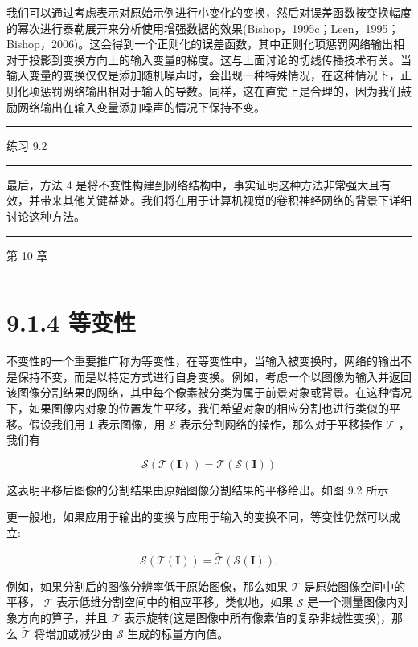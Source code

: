\documentclass[10pt]{report}
\newcommand{\HRule}{\begin{center}\rule{0.9\linewidth}{0.2mm}\end{center}}
\begin{document}
我们可以通过考虑表示对原始示例进行小变化的变换，然后对误差函数按变换幅度的幂次进行泰勒展开来分析使用增强数据的效果(Bishop，1995c；Leen，1995；Bishop，2006)。这会得到一个正则化的误差函数，其中正则化项惩罚网络输出相对于投影到变换方向上的输入变量的梯度。这与上面讨论的切线传播技术有关。当输入变量的变换仅仅是添加随机噪声时，会出现一种特殊情况，在这种情况下，正则化项惩罚网络输出相对于输入的导数。同样，这在直觉上是合理的，因为我们鼓励网络输出在输入变量添加噪声的情况下保持不变。

\HRule

练习 9.2

\HRule

最后，方法 4 是将不变性构建到网络结构中，事实证明这种方法非常强大且有效，并带来其他关键益处。我们将在用于计算机视觉的卷积神经网络的背景下详细讨论这种方法。

\HRule

第 10 章

\HRule

\section*{9.1.4 等变性}

不变性的一个重要推广称为等变性，在等变性中，当输入被变换时，网络的输出不是保持不变，而是以特定方式进行自身变换。例如，考虑一个以图像为输入并返回该图像分割结果的网络，其中每个像素被分类为属于前景对象或背景。在这种情况下，如果图像内对象的位置发生平移，我们希望对象的相应分割也进行类似的平移。假设我们用 \(\mathbf{I}\) 表示图像，用 \(\mathcal{S}\) 表示分割网络的操作，那么对于平移操作 \(\mathcal{T}\) ，我们有

\[
\mathcal{S}\left( {\mathcal{T}\left( \mathbf{I}\right) }\right)  = \mathcal{T}\left( {\mathcal{S}\left( \mathbf{I}\right) }\right)  \tag{9.2}
\]

这表明平移后图像的分割结果由原始图像分割结果的平移给出。如图 9.2 所示

更一般地，如果应用于输出的变换与应用于输入的变换不同，等变性仍然可以成立:

\[
\mathcal{S}\left( {\mathcal{T}\left( \mathbf{I}\right) }\right)  = \widetilde{\mathcal{T}}\left( {\mathcal{S}\left( \mathbf{I}\right) }\right) . \tag{9.3}
\]

例如，如果分割后的图像分辨率低于原始图像，那么如果 \(\mathcal{T}\) 是原始图像空间中的平移， \(\widetilde{\mathcal{T}}\) 表示低维分割空间中的相应平移。类似地，如果 \(\mathcal{S}\) 是一个测量图像内对象方向的算子，并且 \(\mathcal{T}\) 表示旋转(这是图像中所有像素值的复杂非线性变换)，那么 \(\widetilde{\mathcal{T}}\) 将增加或减少由 \(\mathcal{S}\) 生成的标量方向值。
\end{document}
